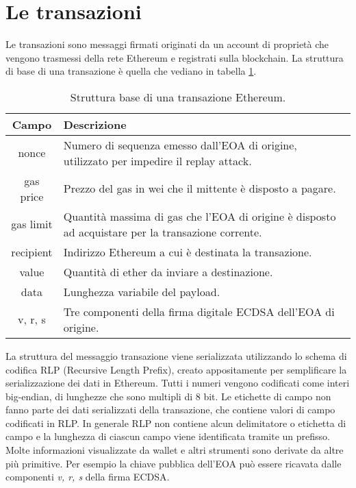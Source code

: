 \section{Le transazioni}
Le transazioni sono messaggi firmati originati da un account di proprietà che vengono trasmessi della rete Ethereum e registrati sulla blockchain. La struttura di base di una transazione è quella che vediano in tabella \ref{tab:struttura_base_transazioni}.
%
\begin{table}[]
	\centering
	\begin{tabular}{|c|p{11cm}|}
		\hline
		\textbf{Campo} & \textbf{Descrizione} \\ \hline
		nonce & Numero di sequenza emesso dall'EOA di origine, utilizzato per impedire il replay attack.\\ \hline
		gas price & Prezzo del gas in wei che il mittente è disposto a pagare.\\ \hline
		gas limit & Quantità massima di gas che l'EOA di origine è disposto ad acquistare per la transazione corrente.\\ \hline
		recipient & Indirizzo Ethereum a cui è destinata la transazione. \\ \hline
		value & Quantità di ether da inviare a destinazione.\\ \hline
		data & Lunghezza variabile del payload.\\ \hline
		v, r, s & Tre componenti della firma digitale ECDSA dell'EOA di origine.\\ \hline
	\end{tabular}
	\caption{Struttura base di una transazione Ethereum.}
	\label{tab:struttura_base_transazioni}
\end{table}
%
La struttura del messaggio transazione viene serializzata utilizzando lo schema di codifica RLP (Recursive Length Prefix), creato appositamente per semplificare la serializzazione dei dati in Ethereum. Tutti i numeri vengono codificati come interi big-endian, di lunghezze che sono multipli di 8 bit. Le etichette di campo non fanno parte dei dati serializzati della transazione, che contiene valori di campo codificati in RLP. In generale RLP non contiene alcun delimitatore o etichetta di campo e la lunghezza di ciascun campo viene identificata tramite un prefisso. Molte informazioni visualizzate da wallet e altri strumenti sono derivate da altre più primitive. Per esempio la chiave pubblica dell'EOA può essere ricavata dalle componenti \textit{v, r, s} della firma ECDSA.

